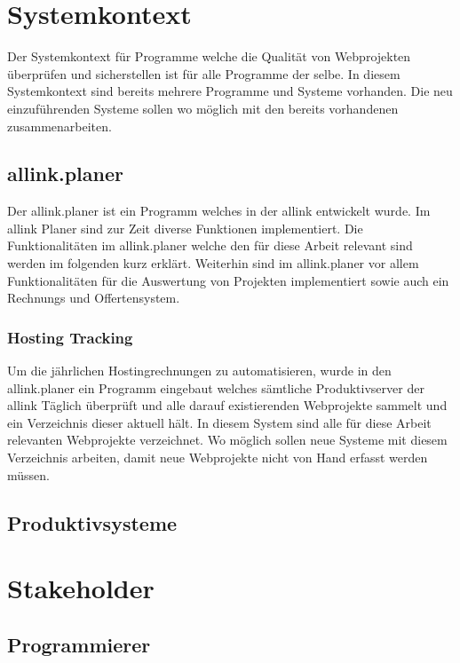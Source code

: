 
\section{Systemkontext}
\label{sec:systemkontext}
Der Systemkontext für Programme welche die Qualität von Webprojekten überprüfen und sicherstellen ist für alle Programme der selbe. In diesem Systemkontext sind bereits mehrere Programme und Systeme vorhanden. Die neu einzuführenden Systeme sollen wo möglich mit den bereits vorhandenen zusammenarbeiten.

\subsection{allink.planer}
\label{sub:allink_planer}
Der allink.planer ist ein Programm welches in der allink entwickelt wurde. Im allink Planer sind zur Zeit diverse Funktionen implementiert. Die Funktionalitäten im allink.planer welche den für diese Arbeit relevant sind werden im folgenden kurz erklärt. Weiterhin sind im allink.planer vor allem Funktionalitäten für die Auswertung von Projekten implementiert sowie auch ein Rechnungs und Offertensystem.

\subsubsection{Hosting Tracking}
\label{ssub:hosting_tracking}
Um die jährlichen Hostingrechnungen zu automatisieren, wurde in den allink.planer ein Programm eingebaut welches sämtliche Produktivserver der allink Täglich überprüft und alle darauf existierenden Webprojekte sammelt und ein Verzeichnis dieser aktuell hält. In diesem System sind alle für diese Arbeit relevanten Webprojekte verzeichnet. Wo möglich sollen neue Systeme mit diesem Verzeichnis arbeiten, damit neue Webprojekte nicht von Hand erfasst werden müssen.

\subsection{Produktivsysteme}
\label{sub:produktivsysteme}


\section{Stakeholder}
\label{sec:stakeholder}

\subsection{Programmierer}
\label{sub:programmierer}



